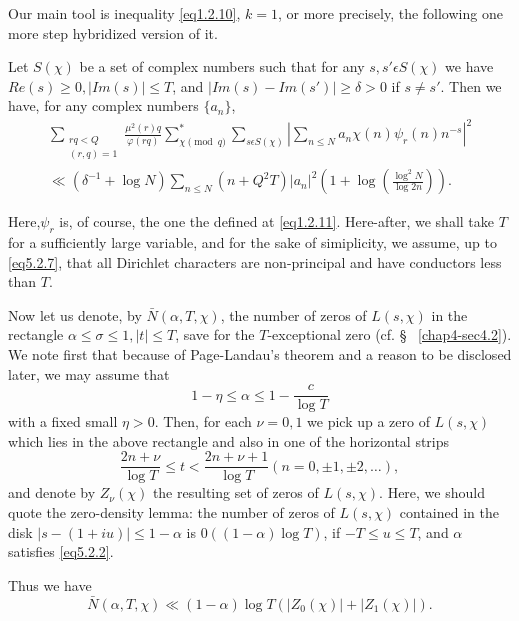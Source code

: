Our main tool is inequality \eqref{eq1.2.10}, $k=1$, or more precisely, the
following one more step hybridized version of it. 
\begin{Lemma}\label{chap5-lem26}
Let $S(\chi)$ be a set of complex numbers such that for any $s, s'
\epsilon  S(\chi)$ we have $Re (s) \geq 0, | Im (s)| \leq T $, and
$|Im (s) - Im (s')| \geq \delta > 0$ if $s \neq s'$. Then we have,
for any complex numbers $\{ a_n\}$, 
\begin{multline*}
  \sum_{\substack{ rq <Q \\ (r,q ) =1}} \frac{\mu^2 (r) q}{\varphi
    (rq)} \sum^*_{\chi \pmod{q}} \sum_{s \epsilon  S (\chi)}
  |\sum_{n \leq N} a_n \chi (n) \psi_r (n) n^{-s}|^2\\ 
  \ll (\delta ^{-1} + \log N) \sum_{n \leq N} (n+Q^2 T) |a_n|^2 \left(1 +
  \log \left(\frac{\log^2 N}{\log 2n}\right)\right). 
\end{multline*}

Here,\pageoriginale  $\psi_r$ is, of course, the one the defined at
\eqref{eq1.2.11}. Here-after, we shall take $T$ for a sufficiently large
variable, and for the sake of simiplicity, we assume, up to
\eqref{eq5.2.7}, that all Dirichlet characters are non-principal and
have conductors less than $T$. 
\end{Lemma}

Now let us denote, by $\bar{N}(\alpha, T, \chi)$, the number of
zeros of $L (s, \chi)$ in the rectangle $\alpha \leq \sigma \leq 1,  |t|
\leq T$, save for the $T$-exceptional zero (cf. \S~
\ref{chap4-sec4.2}). We note first
that because of Page-Landau's theorem and a reason to be disclosed
later, we may assume that 
\begin{equation*}
  1-\eta \leq \alpha \leq 1 - \frac{c}{\log T} \tag{5.2.2}\label{eq5.2.2}
\end{equation*}
with a fixed small $\eta > 0$. Then, for each $\nu = 0,1$ we pick up a
zero of $L (s,  \chi)$ which lies in the above rectangle and also in
one of the horizontal strips 
$$
\frac{2n+\nu}{\log T} \leq t < \frac{2n + \nu + 1}{\log T}(n = 0, \pm
1, \pm 2,  \ldots), 
$$
and denote by $Z_\nu (\chi)$ the resulting set of zeros of $L(s,
\chi)$. Here, we should quote the zero-density lemma:  the number of
zeros of $L (s, \chi)$ contained in the disk $| s- (1 + iu)| \leq 1 -
\alpha$ is $0 (( 1-\alpha) \log T)$, if $-T \leq u \leq  T$,  and
$\alpha$ satisfies \eqref{eq5.2.2}. 

Thus we have
$$
\bar{N} (\alpha, T, \chi)\ll(1-\alpha)\log T(|Z_0(\chi)|+|Z_{1}(\chi)|).
$$

